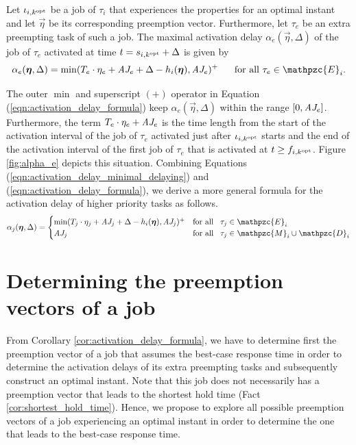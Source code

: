\begin{corollary}\label{cor:activation_delay_formula}
	Let $\iota_{i,k^{\rm{opt}}}$ be a job of $\tau_i$ that experiences the properties for an optimal instant and let $\vec{\eta}$ be its corresponding preemption vector. Furthermore, let $\tau_e$ be an extra preempting task of such a job. The maximal activation delay $\alpha_e(\vec{\eta},\Delta)$ of the job of $\tau_e$ activated at time $t = s_{i,k^{\rm{opt}}}+\Delta$ is given by
	\begin{align} \label{eqn:activation_delay_formula}
		\alpha_e(\vec{\eta},\Delta) = \min(T_e \cdot \eta_e + \aj_e + \Delta - h_i(\vec{\eta}), \aj_e)^+ \hspace{.6cm} \textnormal{for all $\tau_e \in \mathpzc{E}_i$}.
	\end{align}
\end{corollary}

The outer $\min$ and superscript $(+)$ operator in Equation (\ref{eqn:activation_delay_formula}) keep $\alpha_e(\vec{\eta},\Delta)$ within the range $[0,\mbox{\it AJ}_e]$. Furthermore, the term $T_e \cdot \eta_e + \mbox{\it AJ}_e$ is the time length from the start of the activation interval of the job of $\tau_e$ activated just after $\iota_{i,k^{\rm{opt}}}$ starts and the end of the activation interval of the first job of $\tau_e$ that is activated at $t \geq f_{i,k^{\rm{opt}}}$. Figure \ref{fig:alpha_e} depicts this situation. Combining Equations (\ref{eqn:activation_delay_minimal_delaying}) and (\ref{eqn:activation_delay_formula}), we derive a more general formula for the activation delay of higher priority tasks as follows.
\begin{align} \label{eqn:activation_delay}
	\alpha_j(\vec{\eta},\Delta) = \begin{cases} 
	\min(T_j \cdot \eta_j + \aj_j + \Delta - h_i(\vec{\eta}), \aj_j)^+ & \text{for all} \hspace{3mm} \tau_j \in \mathpzc{E}_i\\
	\aj_j & \text{for all} \hspace{3mm} \tau_j \in \mathpzc{M}_i \cup \mathpzc{D}_i
	\end{cases}
\end{align}


\section{Determining the preemption vectors of a job}\label{sec:hold_times_of_a_job}
\iffalse
From Corollary \ref{cor:activation_delay_formula}, we have to determine first the preemption vector of a job that assumes the best-case response time in order to determine the activation delays of its extra preempting tasks and subsequently construct an optimal instant. Note that this job does not necessarily has a preemption vector that leads to the shortest hold time (Fact \ref{cor:shortest_hold_time}). Hence, we propose to explore all possible preemption vectors of a job experiencing an optimal instant in order to determine the one that leads to the best-case response time.

